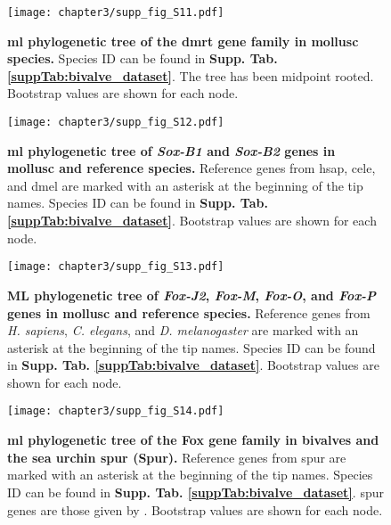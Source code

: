 \documentclass[../main.tex]{subfiles}
\begin{document}
\begin{figure}[ht]
	\centering
	\texttt{[image: chapter3/supp\_fig\_S11.pdf]}
	\captionsetup{width=\textwidth}
	\caption{
		\textbf{\gls{ml} phylogenetic tree of the \gls{dmrt} gene family in mollusc species.} Species ID can be found in \textbf{Supp. Tab. \ref{suppTab:bivalve_dataset}}. The tree has been midpoint rooted. Bootstrap values are shown for each node.
	}
	\label{suppFig:dmrt_molluscOnly}
\end{figure}

\begin{figure}[ht]
	\centering
	\texttt{[image: chapter3/supp\_fig\_S12.pdf]}
	\captionsetup{width=\textwidth}
	\caption{
		\textbf{\gls{ml} phylogenetic tree of \textit{Sox-B1} and \textit{Sox-B2} genes in mollusc and reference species.} Reference genes from \gls{hsap}, \gls{cele}, and \gls{dmel} are marked with an asterisk at the beginning of the tip names. Species ID can be found in \textbf{Supp. Tab. \ref{suppTab:bivalve_dataset}}. Bootstrap values are shown for each node.
	}
	\label{suppFig:sox_B12}
\end{figure}

\begin{figure}[ht]
	\centering
	\texttt{[image: chapter3/supp\_fig\_S13.pdf]}
	\captionsetup{width=\textwidth}
	\caption{
		\textbf{ML phylogenetic tree of \textit{Fox-J2}, \textit{Fox-M}, \textit{Fox-O}, and \textit{Fox-P} genes in mollusc and reference species.} Reference genes from \textit{H. sapiens}, \textit{C. elegans}, and \textit{D. melanogaster} are marked with an asterisk at the beginning of the tip names. Species ID can be found in \textbf{Supp. Tab. \ref{suppTab:bivalve_dataset}}. Bootstrap values are shown for each node.
	}
	\label{suppFig:fox_JMOP}
\end{figure}

\begin{figure}[ht]
	\centering
	\texttt{[image: chapter3/supp\_fig\_S14.pdf]}
	\captionsetup{width=\textwidth}
	\caption{
		\textbf{\gls{ml} phylogenetic tree of the Fox gene family in bivalves and the sea urchin \gls{spur} (Spur).} Reference genes from \gls{spur} are marked with an asterisk at the beginning of the tip names. Species ID can be found in \textbf{Supp. Tab. \ref{suppTab:bivalve_dataset}}. \gls{spur} genes are those given by \textbf{\cite{tu2006sea}}. Bootstrap values are shown for each node.
	}
	\label{suppFig:fox_spur}
\end{figure}
\end{document}
